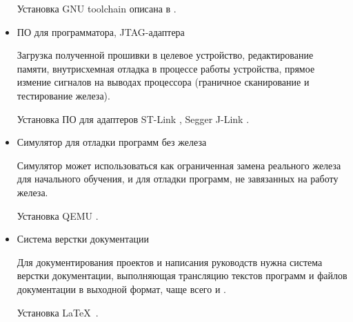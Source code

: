 \begin{itemize}
  Установка GNU toolchain описана в .
  
  \item ПО для программатора, JTAG-адаптера
  
  Загрузка полученной прошивки в целевое устройство, редактирование памяти, 
  внутрисхемная отладка в процессе работы устройства, прямое измение сигналов на
  выводах процессора (граничное сканирование и тестирование железа).
  
  Установка ПО для адаптеров ST-Link , Segger J-Link
  .
  
  \item Симулятор для отладки программ без железа
  
  Симулятор может использоваться как ограниченная замена реального железа
  для начального обучения, и для отладки программ, не завязанных на работу
  железа.
  
  Установка QEMU .
  
  \item Система верстки документации
  
  Для документирования проектов и написания руководств нужна система верстки
  документации, выполняющая трансляцию текстов программ и файлов 
  документации в выходной формат, чаще всего  и .
  
  Установка \LaTeX\ .
  
\end{itemize}

